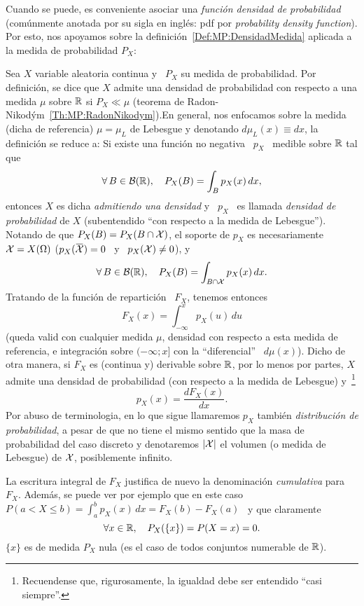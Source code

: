 Cuando  se  puede,  es  conveniente  asociar  una  {\it  funci\'on  densidad  de
  probabilidad} (com\'unmente  anotada por  su sigla en  ingl\'es: pdf  por {\it
  probability   density   function}).   Por   esto,   nos   apoyamos   sobre   la
definici\'on~\ref{Def:MP:DensidadMedida}  aplicada a  la medida  de probabilidad
$P_X$:
%
\begin{definicion}
  Sea $X$ variable  aleatoria continua y \ $P_X$ su  medida de probabilidad. Por
  definici\'on, se dice que $X$  admite una densidad de probabilidad con respecto
  a   una  medida   $\mu$  sobre   $\mathbb{R}$  si   $P_X  \ll   \mu$   (teorema  de
  Radon-Nikod\'ym~\ref{Th:MP:RadonNikodym}).\newline En  general, nos enfocamos
  sobre la  medida (dicha de referencia)  $\mu = \mu_L$ de  Lebesgue y denotando
  $d\mu_L(x) \equiv dx$, la definici\'on se reduce a: Si existe una funci\'on no
  negativa \ $p_X$ \ medible sobre $\mathbb{R}$ tal que
  \[
  \forall \, B \in \mathcal{B}(\mathbb{R}), \quad P_X(B) = \int_B p_X(x) \, dx,
  \]
  entonces $X$  es dicha {\it  admitiendo una densidad}  y \ $p_X$ \  es llamada
  {\it densidad de probabilidad} de  $X$ (subentendido ``con respecto a la medida
  de Lebesgue'').  Notando de que $P_X(B) = P_X(B \cap \mathcal{X})$, el soporte de $p_X$
  es necesariamente $\mathcal{X} = X(\Omega)$ (\ie $p_X(\widebar{\X}) = 0$ \ y \ $p_X(\mathcal{X})
  \ne 0$), y
  \[
  \forall \, B \in \mathcal{B}(\mathbb{R}), \quad P_X(B) = \int_{B \cap \mathcal{X}} p_X(x) \, dx.
  \]
  Tratando de la funci\'on de repartici\'on \ $F_X$, tenemos entonces
  \[
  F_X(x) = \int_{-\infty}^x p_X(u) \, du
  \]
  (queda valid con cualquier medida $\mu$, densidad con respecto a esta medida de
  referencia,  e integraci\'on  sobre $(-\infty;  x]$ con  la  ``diferencial'' \
  $d\mu(x)$).  Dicho  de otra manera, si  $F_X$ es (continua  y) derivable sobre
  $\mathbb{R}$, por lo menos por partes, $X$ admite una densidad de probabilidad (con
  respecto a  la medida de Lebesgue)  y~\footnote{Recuendense que, rigurosamente,
    la igualdad debe ser entendido ``casi siempre''.}
  \[
  p_X(x) = \frac{d F_X(x)}{dx}.
  \]
  Por abuso  de terminologia,  en lo que  sigue llamaremos $p_X$  tambi\'en {\it
    distribuci\'on de  probabilidad}, a pesar de  que no tiene  el mismo sentido
  que la masa de probabilidad del  caso discreto y denotaremos $|\mathcal{X}|$ el volumen
  (o medida de Lebesgue) de $\mathcal{X}$, posiblemente infinito.
\end{definicion}
%
La  escritura  integral de  $F_X$  justifica  de  nuevo la  denominaci\'on  {\it
  cumulativa} para  $F_X$. Adem\'as, se puede  ver por ejemplo que  en este caso
$\displaystyle P(a < X \le b) = \int_a^b p_X(x) \, dx = F_X(b) - F_X(a)$ \ y que
claramente
%
\[
\forall x \in \mathbb{R}, \quad P_X(\{x\}) = P(X = x) = 0.
\]
%
$\{ x \}$  es de medida $P_X$ nula  (es el caso de todos  conjuntos numerable de
$\mathbb{R}$).

